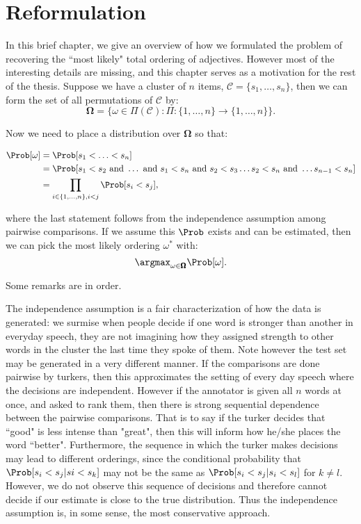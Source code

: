 \section{Reformulation}

In this brief chapter, we give an overview of how we formulated the problem of recovering the ``most likely" total ordering of adjectives. However most of the interesting details are missing, and this chapter serves as a motivation for the rest of the thesis. Suppose we have a cluster of $n$ items, $\mathcal C = \{s_1, \ldots, s_n\}$, then we can form the set of all permutations of $\mathcal{C}$ by:
	\[
		\pmb \Omega = \{ \omega \in \Pi(\mathcal{C}) : \Pi : \{1,\ldots,n\} \rightarrow \{1,\ldots,n\}\}.
	\]

Now we need to place a distribution over $\pmb \Omega$ so that:

	\begin{align*}
		\Prob[\omega] &= \Prob[s_1 < \ldots < s_n] \\
				      &= \Prob[ s_1 < s_2 \text{ and } \ldots \text{ and } s_1 < s_n \text{ and } s_2 < s_3 \ldots s_2 < s_n \text{ and } \ldots s_{n-1} < s_n] \\
				      &= \prod_{i \in \{1,\ldots,n\}, i < j} \Prob[ s_i < s_j ],
	\end{align*}

where the last statement follows from the independence assumption among pairwise comparisons. If we assume this $\Prob$ exists and can be estimated, then we can pick the most likely ordering $\omega^*$ with:
	\[
		\argmax_{\omega \in \pmb{\Omega}} \Prob[\omega].
	\]

Some remarks are in order.

\begin{remark}
The independence assumption is a fair characterization of how the data is generated: we surmise when people decide if one word is stronger than another in everyday speech, they are not imagining how they assigned strength to other words in the cluster the last time they spoke of them. Note however the test set may be generated in a very different manner. If the comparisons are done pairwise by turkers, then this approximates the setting of every day speech where the decisions are independent. However if the annotator is given all $n$ words at once, and asked to rank them, then there is strong sequential dependence between the pairwise comparisons. That is to say if the turker decides that ``good" is less intense than "great", then this will inform how he/she places the word ``better". Furthermore, the 
sequence in which the turker makes decisions may lead to different orderings, since the conditional probability that $\Prob[ s_i < s_j | si < s_k ]$ may not be the same as $\Prob [s_i < s_j | s_i < s_l ]$ for $k \neq l$. However, we do not observe this sequence of decisions and therefore cannot decide if our estimate is close to the true distribution. Thus the independence assumption is, in some sense, the most conservative approach.
\end{remark} 


